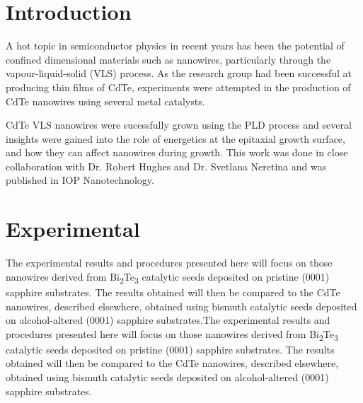 \section{Introduction}
A hot topic in semiconductor physics in recent years has been the potential of confined dimensional materials such as nanowires, particularly through the vapour-liquid-solid (VLS) process. As the research group had been successful at producing thin films of CdTe, experiments were attempted in the production of CdTe nanowires using several metal catalysts.

CdTe VLS nanowires were sucessfully grown using the PLD process and several insights were gained into the role of energetics at the epitaxial growth surface, and how they can affect nanowires during growth. This work was done in close collaboration with Dr. Robert Hughes and Dr. Svetlana Neretina and was published in IOP Nanotechnology\cite{Neretina2008b}.

\section{Experimental}
The experimental results and procedures presented here will
focus on those nanowires derived from Bi\textsubscript{2}Te\textsubscript{3} catalytic seeds
deposited on pristine (0001) sapphire substrates. The results
obtained will then be compared to the CdTe nanowires,
described elsewhere\cite{Neretina2007b}, obtained using bismuth catalytic
seeds deposited on alcohol-altered (0001) sapphire substrates.The experimental results and procedures presented here will
focus on those nanowires derived from Bi\textsubscript{2}Te\textsubscript{3} catalytic seeds
deposited on pristine (0001) sapphire substrates. The results
obtained will then be compared to the CdTe nanowires,
described elsewhere\cite{Neretina2007b}, obtained using bismuth catalytic
seeds deposited on alcohol-altered (0001) sapphire substrates.

